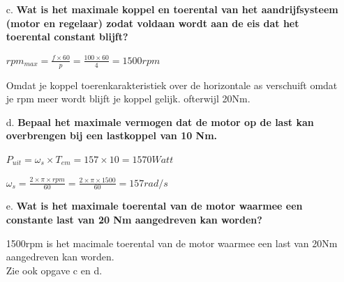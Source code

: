 \begin{enumerate}
    \item [c.] \textbf{Wat is het maximale koppel en toerental van het aandrijfsysteem (motor en regelaar) zodat voldaan wordt aan de eis dat het toerental constant blijft?}
    
        $rpm_{max} = \frac{f \times 60}{p} = \frac{100 \times 60}{4} = 1500rpm$

        Omdat je koppel toerenkarakteristiek over de horizontale as verschuift omdat je rpm meer wordt blijft je koppel gelijk. ofterwijl 20Nm.


    \item [d.] \textbf{Bepaal het maximale vermogen dat de motor op de last kan overbrengen bij een lastkoppel van 10 Nm.}     
    
        $ P_{uit} = \omega_{s} \times T_{em} = 157 \times 10 = 1570 Watt $

        $ \omega_{s} 
        = \frac{2 \times \pi \times rpm}{60} 
        = \frac{2 \times \pi \times 1500}{60} 
        = 157 rad/s$

    \item [e.] \textbf{Wat is het maximale toerental van de motor waarmee een constante last van 20 Nm aangedreven kan worden?}
    
        1500rpm is het macimale toerental van de motor waarmee een last van 20Nm aangedreven kan worden.\\
        Zie ook opgave c en d.

\end{enumerate}